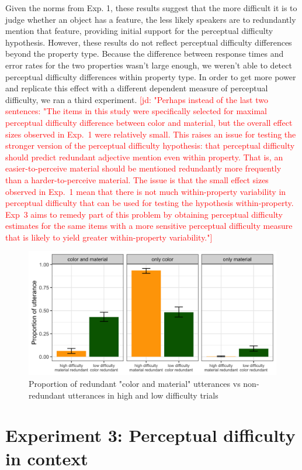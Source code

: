 \documentclass[12pt,letterpaper]{article}
\newcommand{\jd}[1]{\textcolor{Red}{[jd: #1]}}
\begin{document}
Given the norms from Exp. 1, these results suggest that the more difficult it is to judge whether an object has a feature, the less likely speakers are to redundantly mention that feature, providing initial support for the perceptual difficulty hypothesis. However, these results do not reflect perceptual difficulty differences beyond the property type. Because the difference between response times and error rates for the two properties wasn't large enough, we weren't able to detect perceptual difficulty differences within property type. In order to get more power and replicate this effect with a different dependent measure of perceptual difficulty, we ran a third experiment.
 \jd{"Perhaps instead of the last two sentences: "The items in this study were specifically selected for maximal perceptual difficulty difference between color and material, but the overall effect sizes observed in Exp.~1 were relatively small. This raises an issue for testing the stronger version of the perceptual difficulty hypothesis: that perceptual difficulty should predict redundant adjective mention even within property. That is, an easier-to-perceive material should be mentioned redundantly more frequently than a harder-to-perceive material. The issue is that the small effect sizes observed in Exp.~1 mean that there is not much within-property variability in perceptual difficulty that can be used for testing the hypothesis within-property. Exp~3 aims to remedy part of this problem by obtaining perceptual difficulty estimates for the same items with a more sensitive perceptual difficulty measure that is likely to yield greater within-property variability."} 
\begin{figure}[ht]
\centering
\includegraphics[width=.8\textwidth]{plots/exp2_proportion.png}
\caption{Proportion of redundant "color and material" utterances vs non-redundant utterances in high and low difficulty trials}
\label{fig:exp2_proportion}
\end{figure}

\section{Experiment 3: Perceptual difficulty in context} 
\end{document}
